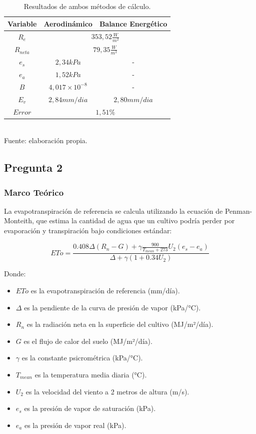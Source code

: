 \documentclass{article}  %
\begin{document}
\begin{table}[H]
  \centering
  \caption{Resultados de ambos métodos de cálculo.}
  \begin{tabular}{|c|c|c|}
      \hline
      Variable & Aerodinámico & Balance Energético \\ \hline
      $R_e$ & \multicolumn{2}{|c|}{$353,52 \frac{W}{m^2}$} \\ \hline
      $R_{neta}$ & \multicolumn{2}{|c|}{$79,35 \frac{W}{m^2}$} \\ \hline
      $e_s$ & $2,34 kPa$ & - \\ \hline
      $e_a$ & $1,52 kPa$ & - \\ \hline
      $B$ & $4,017 \times 10^{-8}$ & - \\ \hline
      $E_v$ & $2,84 mm/dia$ & $2,80 mm/dia$ \\ \hline
      $Error$ & \multicolumn{2}{|c|}{$1,51 \%$} \\ \hline
  \end{tabular}
  \\ Fuente: elaboración propia.
\end{table}

\subsection{Pregunta 2}

\subsubsection{Marco Teórico}

La evapotranspiración de referencia se calcula utilizando la ecuación de Penman-Monteith, que estima la cantidad de agua que un cultivo podría perder por evaporación y transpiración bajo condiciones estándar:

\begin{equation}
  ETo = \frac{0.408 \Delta (R_n - G) + \gamma \frac{900}{T_{mean} + 273} U_2 (e_s - e_a)}{\Delta + \gamma (1 + 0.34 U_2)}
\end{equation}

Donde:

\begin{itemize}
  \item $ETo$ es la evapotranspiración de referencia (mm/día).
  \item $\Delta$ es la pendiente de la curva de presión de vapor (kPa/°C).
  \item $R_n$ es la radiación neta en la superficie del cultivo (MJ/m²/día).
  \item $G$ es el flujo de calor del suelo (MJ/m²/día).
  \item $\gamma$ es la constante psicrométrica (kPa/°C).
  \item $T_{mean}$ es la temperatura media diaria (°C).
  \item $U_2$ es la velocidad del viento a 2 metros de altura (m/s).
  \item $e_s$ es la presión de vapor de saturación (kPa).
  \item $e_a$ es la presión de vapor real (kPa).
\end{itemize}
\end{document}
